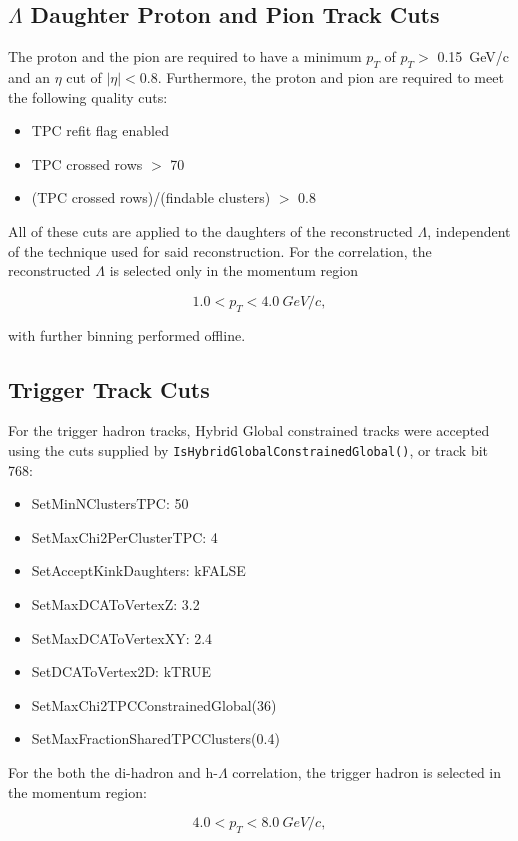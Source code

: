 \documentclass[ALICE,manyauthors]{ALICE_analysis_notes}
\begin{document}
\begin{itemize}
\subsection{$\Lambda$ Daughter Proton and Pion Track Cuts}
\label{daughtercuts}
The proton and the pion are required to have a minimum $p_{T}$ of $p_{T} >$ \SI{0.15}{GeV/c} and an $\eta$ cut of $|{\eta}| < 0.8$. Furthermore, the proton and pion are required to meet the following quality cuts:
\begin{itemize}
	\item TPC refit flag enabled
	\item TPC crossed rows $>$ 70
	\item (TPC crossed rows)/(findable clusters) $>$ 0.8
\end{itemize}
All of these cuts are applied to the daughters of the reconstructed $\Lambda$, independent of the technique used for said reconstruction. For the correlation, the reconstructed $\Lambda$ is selected only in the momentum region

$${1.0 < p_{T} < \SI{4.0}{GeV/c}},$$

with further binning performed offline.

\subsection{Trigger Track Cuts}
\label{trigcuts}
For the trigger hadron tracks, Hybrid Global constrained tracks were accepted using the cuts supplied by \texttt{IsHybridGlobalConstrainedGlobal()}, or track bit 768:

\begin{itemize}
	\item SetMinNClustersTPC: 50
	\item SetMaxChi2PerClusterTPC: 4
	\item SetAcceptKinkDaughters: kFALSE
	\item SetMaxDCAToVertexZ: 3.2
	\item SetMaxDCAToVertexXY: 2.4
	\item SetDCAToVertex2D: kTRUE
	\item SetMaxChi2TPCConstrainedGlobal(36)
	\item SetMaxFractionSharedTPCClusters(0.4)
\end{itemize}

For the both the di-hadron and h-$\Lambda$ correlation, the trigger hadron is selected in the momentum region:

$${4.0 < p_{T} < \SI{8.0}{GeV/c}},$$


\end{itemize}
\end{document}
